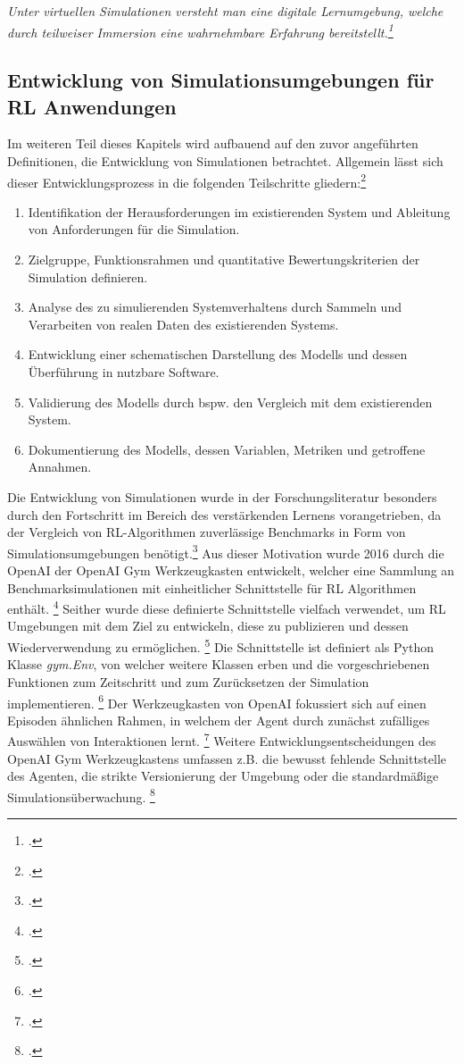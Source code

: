 \textit{Unter virtuellen Simulationen versteht man eine digitale Lernumgebung, welche durch teilweiser Immersion eine wahrnehmbare Erfahrung bereitstellt.\footcite[Vgl.][S. 1]{Foronda.2021}}

\subsection{Entwicklung von Simulationsumgebungen für RL Anwendungen}
Im weiteren Teil dieses Kapitels wird aufbauend auf den zuvor angeführten Definitionen, die Entwicklung von Simulationen betrachtet.
Allgemein lässt sich dieser Entwicklungsprozess in die folgenden Teilschritte gliedern:\footcite[Vgl.][S. 8f.]{Maria.1997}
\begin{enumerate}
    \item Identifikation der Herausforderungen im existierenden System und Ableitung von Anforderungen für die Simulation.
    \item Zielgruppe, Funktionsrahmen und quantitative Bewertungskriterien der Simulation definieren.
    \item Analyse des zu simulierenden Systemverhaltens durch Sammeln und Verarbeiten von realen Daten des existierenden Systems.
    \item Entwicklung einer schematischen Darstellung des Modells und dessen Überführung in nutzbare Software.
    \item Validierung des Modells durch bspw. den Vergleich mit dem existierenden System.
    \item Dokumentierung des Modells, dessen Variablen, Metriken und getroffene Annahmen.
\end{enumerate}

Die Entwicklung von Simulationen wurde in der Forschungsliteratur besonders durch den Fortschritt im Bereich des verstärkenden Lernens vorangetrieben, da der Vergleich von RL-Algorithmen zuverlässige Benchmarks in Form von Simulationsumgebungen benötigt.\footcite[Vgl.][S. 1]{Brockman.2016}
Aus dieser Motivation wurde 2016 durch die OpenAI der OpenAI Gym Werkzeugkasten entwickelt, welcher eine Sammlung an Benchmarksimulationen mit einheitlicher Schnittstelle für RL Algorithmen enthält. \footcite[Vgl.][S. 1]{Brockman.2016}
Seither wurde diese definierte Schnittstelle vielfach verwendet, um RL Umgebungen mit dem Ziel zu entwickeln, diese zu publizieren und dessen Wiederverwendung zu ermöglichen. \footcite[Vgl.][S. 4]{Schuderer.2021}
Die Schnittstelle ist definiert als Python Klasse \textit{gym.Env}, von welcher weitere Klassen erben und die vorgeschriebenen Funktionen zum Zeitschritt und zum Zurücksetzen der Simulation implementieren. \footcite[Vgl.][S. 4]{Schuderer.2021}
Der Werkzeugkasten von OpenAI fokussiert sich auf einen Episoden ähnlichen Rahmen, in welchem der Agent durch zunächst zufälliges Auswählen von Interaktionen lernt. \footcite[Vgl.][S. 1]{Brockman.2016}
Weitere Entwicklungsentscheidungen des OpenAI Gym Werkzeugkastens umfassen z.B. die bewusst fehlende Schnittstelle des Agenten, die strikte Versionierung der Umgebung oder die standardmäßige Simulationsüberwachung. \footcite[Vgl.][S. 2f.]{Brockman.2016} %


